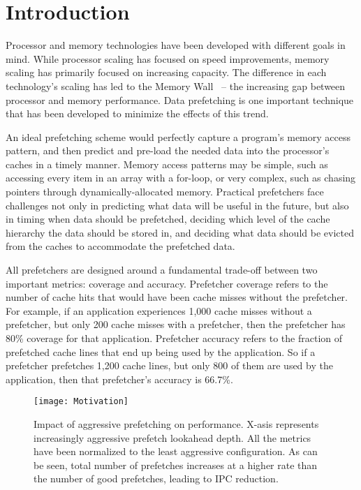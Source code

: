 \section{Introduction}
\label{Introduction}

Processor and memory technologies have been developed with different
goals in mind. While processor scaling has focused on speed improvements,
memory scaling has primarily focused on increasing capacity. The
difference in each technology's scaling has led to the Memory Wall~\cite{MemWall}
-- the increasing gap between processor and memory performance. Data prefetching
is one important technique that has been developed to minimize the effects 
of this trend.


An ideal prefetching scheme would perfectly capture a program's memory access pattern, and then
predict and pre-load the needed data into the processor's caches in a timely manner. 
Memory access patterns may be simple, such as accessing every item in an array with a for-loop,
or very complex, such as chasing pointers through dynamically-allocated memory.
Practical prefetchers face challenges not only in predicting what data will be useful in the future,
but also in timing when data should be prefetched, deciding which level of the cache hierarchy
the data should be stored in, and deciding what data should be evicted from the caches to accommodate
the prefetched data.

All prefetchers are designed around a fundamental trade-off between two important metrics:
coverage and accuracy. Prefetcher coverage refers to the number of cache hits that would have
been cache misses without the prefetcher. For example, if an application experiences 1,000 cache misses
without a prefetcher, but only 200 cache misses with a prefetcher, then the prefetcher has 80\%
coverage for that application. Prefetcher accuracy refers to the fraction of prefetched cache lines
that end up being used by the application. So if a prefetcher prefetches 1,200 cache lines, 
but only 800 of them are used by the application, then that prefetcher's accuracy is 66.7\%.


\begin{figure}[t]
\texttt{[image: Motivation]}
\caption{Impact of aggressive prefetching on performance. X-asis represents increasingly 
	 aggressive prefetch lookahead depth. All the metrics have been normalized
	 to the least aggressive configuration. As can be seen, total number of prefetches increases at a
	 higher rate than the number of good prefetches, leading to IPC reduction.}
\label{Fig:Motivation}
\end{figure}

